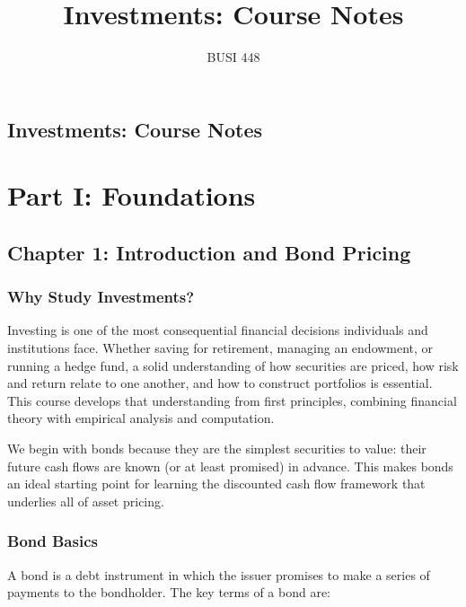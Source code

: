 \documentclass[11pt,letterpaper]{report}
\title{\textbf{Investments: Course Notes}}
\author{BUSI 448}
\date{}
\begin{document}
\maketitle
\tableofcontents
\newpage

\chapter{Investments: Course Notes}



\part{Part I: Foundations}



\chapter{Chapter 1: Introduction and Bond Pricing}


\section{Why Study Investments?}


Investing is one of the most consequential financial decisions individuals and institutions face.  Whether saving for retirement, managing an endowment, or running a hedge fund, a solid understanding of how securities are priced, how risk and return relate to one another, and how to construct portfolios is essential.  This course develops that understanding from first principles, combining financial theory with empirical analysis and computation.

We begin with bonds because they are the simplest securities to value: their future cash flows are known (or at least promised) in advance.  This makes bonds an ideal starting point for learning the discounted cash flow framework that underlies all of asset pricing.

\section{Bond Basics}


A bond is a debt instrument in which the issuer promises to make a series of payments to the bondholder.  The key terms of a bond are:

\end{document}
